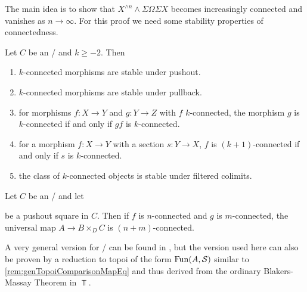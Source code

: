 The main idea is to show that $X^{\wedge n}\wedge\Sigma\Omega\Sigma X$ becomes increasingly connected and vanishes as $n\to\infty$.
For this proof we need some stability properties of connectedness.
\begin{prop}\label{prop:conn}
    Let $C$ be an \inftytop/ and $k\geq -2$.
    Then
    \begin{enumerate}[label={(\roman*)}]
        \item $k$-connected morphisms are stable under pushout. \label{prop:connStableUnderPo}
        \item $k$-connected morphisms are stable under pullback.\label{prop:connStableUnderPb}
        \item for morphisms $f\colon X\to Y$ and $g\colon Y\to Z$ with $f$ $k$-connected, the morphism $g$ is $k$-connected if and only if $gf$ is $k$-connected. \label{prop:connRightCancel}
        \item for a morphism $f\colon X\to Y$ with a section $s\colon Y\to X$, $f$ is $(k+1)$-connected if and only if $s$ is $k$-connected. \label{prop:connSection}
        \item the class of $k$-connected objects is stable under filtered colimits. \label{prop:connStableFilteredColim}
    \end{enumerate}
    \begin{reference}
        \cite[Proposition 4.10]{splittings_21}
    \end{reference}
\end{prop}
\begin{prop}\label{prop:blakersMassay}
    Let $C$ be an \inftytop/ and let 
    \begin{center}
    \end{center}
    be a pushout square in $C$.
    Then if $f$ is $n$-connected and $g$ is $m$-connected, the universal map $A\to B\times_{D}C$ is $(n+m)$-connected.
    \begin{reference}
        A very general version for \inftytops/ can be found in \cite[Corollary 4.3.1]{gen_blakers_massey}, but the version used here can also be proven by a reduction to topoi of the form $\operatorname{Fun}(A,\mathcal{S})$ similar to \cref{rem:genTopoiComparisonMapEq} and thus derived from the ordinary Blakers-Massay Theorem in $\Top$.
    \end{reference}
\end{prop}
